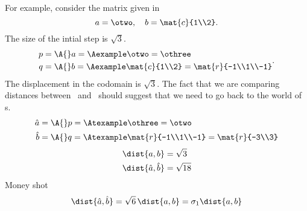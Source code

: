 For example, consider the matrix given in %
\begin{equation}
  a = \otwo, \quad b = \mat{c}{1\\2}.
\end{equation}
The size of the intial step is $\sqrt{3}$.
\begin{equation}
   \begin{split}
     p &= \A{}a = \Aexample \otwo = \othree \\
     q &= \A{}b = \Aexample \mat{c}{1\\2} = \mat{r}{-1\\1\\-1}
  \end{split}.
\end{equation}
The displacement in the codomain is $\sqrt{3}$. The fact that we are comparing distances between \vv \ and \vvv \ should suggest that we need to go back to the world of \vvv s.
\begin{equation}
  \begin{split}
     \hat{a} &= \A{}p = \Atexample \othree = \otwo \\
     \hat{b} &= \A{}q = \Atexample \mat{r}{-1\\1\\-1} = \mat{r}{-3\\3}
  \end{split}
\end{equation}
\begin{equation}
  \begin{split}
     \dist{a,b} &= \sqrt{3} \\
     \dist{\hat{a},\hat{b}} &= \sqrt{18}
  \end{split}
\end{equation}
Money shot
\begin{equation}
  \dist{\hat{a},\hat{b}} = \sqrt{6} \, \dist{a,b} = \sigma_{1} \dist{a,b}
\end{equation}

